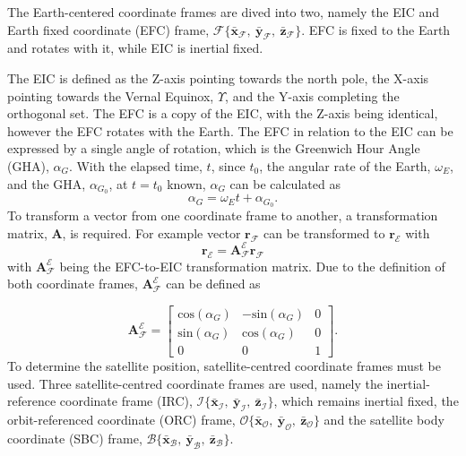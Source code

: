 The Earth-centered coordinate frames are dived into two, namely the EIC and Earth fixed coordinate (EFC) frame, $\mathcal{F}\{\bar{\mathbf{x}}_{\mathcal{F}},~\bar{\mathbf{y}}_{\mathcal{F}},~\bar{\mathbf{z}}_{\mathcal{F}}\}$. EFC is fixed to the Earth and rotates with it, while EIC is inertial fixed.


The EIC is defined as the Z-axis pointing towards the north pole, the X-axis pointing towards the Vernal Equinox, $\Upsilon$, and the Y-axis completing the orthogonal set. The EFC is a copy of the EIC, with the Z-axis being identical, however the EFC rotates with the Earth. The EFC in relation to the EIC can be expressed by a single angle of rotation, which is the Greenwich Hour Angle (GHA), $\alpha_G$. With the elapsed time, $t$, since $t_0$, the angular rate of the Earth, $\omega_E$, and the GHA, $\alpha_{G_0}$, at $t = t_0$ known, $\alpha_G$ can be calculated as 
\begin{equation}
\alpha_G = \omega_Et + \alpha_{G_0}.
\end{equation}
To transform a vector from one coordinate frame to another, a transformation matrix, $\boldsymbol{A}$, is required. For example vector $\mathbf{r}_{\mathcal{F}}$ can be transformed to $\mathbf{r}_{\mathcal{E}}$ with 
\begin{equation}
\mathbf{r}_{\mathcal{E}} = \boldsymbol{A}^{\mathcal{E}}_{\mathcal{F}}\mathbf{r}_{\mathcal{F}}
\end{equation}
with $\boldsymbol{A}^{\mathcal{E}}_{\mathcal{F}}$ being the EFC-to-EIC transformation matrix. Due to the definition of both coordinate frames, $\boldsymbol{A}^{\mathcal{E}}_{\mathcal{F}}$ can be defined as

\begin{equation}
\boldsymbol{A}^{\mathcal{E}}_{\mathcal{F}} = 
\begin{bmatrix}
	\text{cos}(\alpha_G) & -\text{sin}(\alpha_G) & 0\\
	\text{sin}(\alpha_G) & \text{cos}(\alpha_G) & 0 \\
	0 & 0 & 1
\end{bmatrix}.
\end{equation}
To determine the satellite position, satellite-centred coordinate frames must be used. Three satellite-centred coordinate frames are used, namely the inertial-reference coordinate frame (IRC), $\mathcal{I}\{\bar{\mathbf{x}}_{\mathcal{I}},~\bar{\mathbf{y}}_{\mathcal{I}},~\bar{\mathbf{z}}_{\mathcal{I}}\}$,  which remains inertial fixed, the orbit-referenced coordinate (ORC) frame, $\mathcal{O}\{\bar{\mathbf{x}}_{\mathcal{O}},~\bar{\mathbf{y}}_{\mathcal{O}},~\bar{\mathbf{z}}_{\mathcal{O}}\}$ and the satellite body coordinate (SBC) frame, $\mathcal{B}\{\bar{\mathbf{x}}_{\mathcal{B}},~\bar{\mathbf{y}}_{\mathcal{B}},~\bar{\mathbf{z}}_{\mathcal{B}}\}$. 

